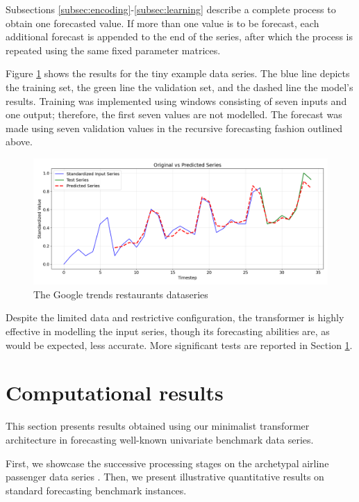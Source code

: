\documentclass[algorithms,article,submit,pdftex,moreauthors]{Definitions/mdpi}
\begin{document}
Subsections \ref{subsec:encoding}-\ref{subsec:learning} describe a complete process to obtain one forecasted value. If more than one value is to be forecast, each additional forecast is appended to the end of the series, after which the process is repeated using the same fixed parameter matrices.

Figure \ref{fig:restaurants} shows the results for the tiny example data series. The blue line depicts the training set, the green line the validation set, and the dashed line the model's results. Training was implemented using windows consisting of seven inputs and one output; therefore, the first seven values are not modelled. The forecast was made using seven validation values in the recursive forecasting fashion outlined above.

\begin{figure}
    \centering
    \includegraphics[width=0.95\linewidth]{restaurants.png}
    \caption{The Google trends restaurants dataseries}
    \label{fig:restaurants}
\end{figure}

Despite the limited data and restrictive configuration, the transformer is highly effective in modelling the input series, though its forecasting abilities are, as would be expected, less accurate. More significant tests are reported in Section \ref{sec:results}.

\section{Computational results} \label{sec:results}

This section presents results obtained using our minimalist transformer architecture in forecasting well-known univariate benchmark data series.

First, we showcase the successive processing stages on the archetypal airline passenger data series \citep{BJ70}. Then, we present illustrative quantitative results on standard forecasting benchmark instances.
\end{document}
